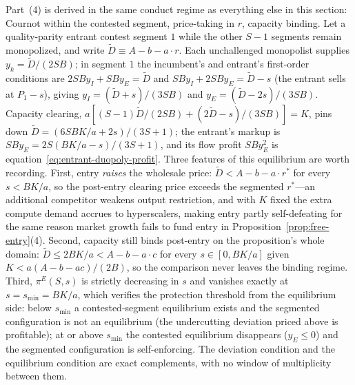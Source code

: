 \documentclass[11pt]{article}
\begin{document}
Part~(4) is derived in the same conduct regime as everything else in this section: Cournot within the contested segment, price-taking in $r$, capacity binding. Let a quality-parity entrant contest segment $1$ while the other $S-1$ segments remain monopolized, and write $\tilde D\equiv A-b-a\cdot r$. Each unchallenged monopolist supplies $y_k=\tilde D/(2SB)$; in segment $1$ the incumbent's and entrant's first-order conditions are $2SBy_I+SBy_E=\tilde D$ and $SBy_I+2SBy_E=\tilde D-s$ (the entrant sells at $P_1-s$), giving $y_I=(\tilde D+s)/(3SB)$ and $y_E=(\tilde D-2s)/(3SB)$. Capacity clearing, $a\left[(S-1)\tilde D/(2SB)+(2\tilde D-s)/(3SB)\right]=K$, pins down $\tilde D=(6SBK/a+2s)/(3S+1)$; the entrant's markup is $SBy_E=2S(BK/a-s)/(3S+1)$, and its flow profit $SBy_E^{2}$ is equation~\eqref{eq:entrant-duopoly-profit}. Three features of this equilibrium are worth recording. First, entry \emph{raises} the wholesale price: $\tilde D<A-b-a\cdot r^{*}$ for every $s<BK/a$, so the post-entry clearing price exceeds the segmented $r^{*}$---an additional competitor weakens output restriction, and with $K$ fixed the extra compute demand accrues to hyperscalers, making entry partly self-defeating for the same reason market growth fails to fund entry in Proposition~\ref{prop:free-entry}(4). Second, capacity still binds post-entry on the proposition's whole domain: $\tilde D\leq2BK/a<A-b-a\cdot c$ for every $s\in[0,BK/a]$ given $K<a(A-b-ac)/(2B)$, so the comparison never leaves the binding regime. Third, $\pi^{E}(S,s)$ is strictly decreasing in $s$ and vanishes exactly at $s=s_{\min}=BK/a$, which verifies the protection threshold from the equilibrium side: below $s_{\min}$ a contested-segment equilibrium exists and the segmented configuration is not an equilibrium (the undercutting deviation priced above is profitable); at or above $s_{\min}$ the contested equilibrium disappears ($y_E\leq0$) and the segmented configuration is self-enforcing. The deviation condition and the equilibrium condition are exact complements, with no window of multiplicity between them.
\end{document}
